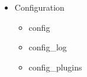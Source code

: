\documentclass[a4paper, 14pt]{extarticle}
\begin{document}
\begin{itemize}
    \item Configuration
        \begin{itemize}
            \item config
            \item config\_log
            \item config\_plugins
        \end{itemize}



\end{itemize}
\end{document}
